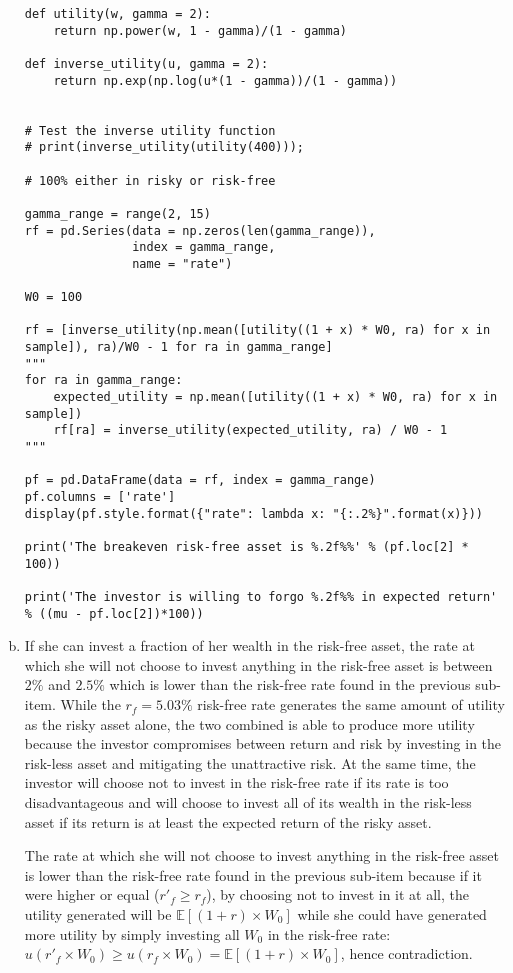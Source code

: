 \documentclass[10pt]{article}
\newcommand{\Ebb}{\mathbb{E}}
\newenvironment{exercise}[2][Exercise]{\begin{trivlist}
  \item[\hskip \labelsep {\bfseries #1}\hskip \labelsep {\bfseries #2.}]}{\end{trivlist}}
\begin{document}
\begin{exercise}{2}
\begin{enumerate}[(a)]
\begin{lstlisting}
def utility(w, gamma = 2):
    return np.power(w, 1 - gamma)/(1 - gamma)

def inverse_utility(u, gamma = 2):
    return np.exp(np.log(u*(1 - gamma))/(1 - gamma))


# Test the inverse utility function
# print(inverse_utility(utility(400)));

# 100% either in risky or risk-free

gamma_range = range(2, 15)
rf = pd.Series(data = np.zeros(len(gamma_range)),
               index = gamma_range,
               name = "rate")

W0 = 100

rf = [inverse_utility(np.mean([utility((1 + x) * W0, ra) for x in sample]), ra)/W0 - 1 for ra in gamma_range]
"""
for ra in gamma_range:
    expected_utility = np.mean([utility((1 + x) * W0, ra) for x in sample])
    rf[ra] = inverse_utility(expected_utility, ra) / W0 - 1
"""
    
pf = pd.DataFrame(data = rf, index = gamma_range)
pf.columns = ['rate']
display(pf.style.format({"rate": lambda x: "{:.2%}".format(x)}))

print('The breakeven risk-free asset is %.2f%%' % (pf.loc[2] * 100))

print('The investor is willing to forgo %.2f%% in expected return' % ((mu - pf.loc[2])*100))
    \end{lstlisting}
    \item
      If she can invest a fraction of her wealth in the risk-free asset, the
      rate at which she will not choose to invest anything in the risk-free
      asset is between $2\%$ and $2.5\%$ which is lower than the risk-free rate
      found in the previous sub-item.
      While the $r_f = 5.03\%$ risk-free rate generates the same amount of
      utility as the risky asset alone, the two combined is able to produce more
      utility because the investor compromises between return and risk by
      investing in the risk-less asset and mitigating the unattractive risk.
      At the same time, the investor will choose not to invest in the risk-free
      rate if its rate is too disadvantageous and will choose to invest all of
      its wealth in the risk-less asset if its return is at least the expected
      return of the risky asset.

      The rate at which she will not choose to
      invest anything in the risk-free asset is lower than the risk-free rate
      found in the previous sub-item because if it were higher or equal ($r'_f \geq 
      r_f$), by
      choosing not to invest in it at all, the utility generated will be
      $\Ebb\left[ (1 + r) \times W_0 \right]$ while she could have generated more
      utility by simply investing all $W_0$ in the risk-free rate:
      $u(r'_f \times W_0) \geq u(r_f \times W_0) = \Ebb\left[ (1 + r) \times W_0
      \right]$, hence contradiction.



\end{enumerate}
\end{exercise}
\end{document}
